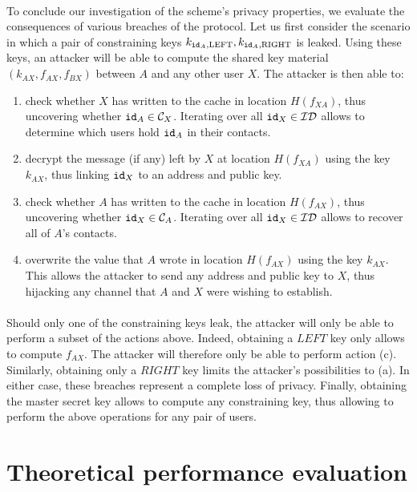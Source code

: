	\paragraph{} To conclude our investigation of the scheme's privacy properties, we evaluate the consequences of various breaches of the protocol. Let us first consider the scenario in which a pair of constraining keys $k_{\mathtt{id}_A,\mathrm{LEFT}}, k_{\mathtt{id}_A,\mathrm{RIGHT}}$ is leaked. Using these keys, an attacker will be able to compute the shared key material $(k_{AX}, f_{AX}, f_{BX})$ between $A$ and any other user $X$. The attacker is then able to:
	\begin{enumerate}[label=(\alph*)]
		\item check whether $X$ has written to the cache in location $H(f_{XA})$, thus uncovering whether $\mathtt{id}_A \in \mathcal{C}_{X}$. Iterating over all $\mathtt{id}_X \in \mathcal{ID}$ allows to determine which users hold $\mathtt{id}_A$ in their contacts. 
		\item decrypt the message (if any) left by $X$ at location $H(f_{XA})$ using the key $k_{AX}$, thus linking $\mathtt{id}_X$ to an address and public key.
		\item check whether $A$ has written to the cache in location $H(f_{AX})$, thus uncovering whether $\mathtt{id}_X \in \mathcal{C}_{A}$. Iterating over all $\mathtt{id}_X \in \mathcal{ID}$ allows to recover all of $A$'s contacts.
		\item overwrite the value that $A$ wrote in location $H(f_{AX})$ using the key $k_{AX}$. This allows the attacker to send any address and public key to $X$, thus hijacking any channel that $A$ and $X$ were wishing to establish.
	\end{enumerate}
	
	\paragraph{} Should only one of the constraining keys leak, the attacker will only be able to perform a subset of the actions above. Indeed, obtaining a $LEFT$ key only allows to compute $f_{AX}$. The attacker will therefore only be able to perform action (c). Similarly, obtaining only a $RIGHT$ key limits the attacker's possibilities to (a). In either case, these breaches represent a complete loss of privacy. Finally, obtaining the master secret key allows to compute any constraining key, thus allowing to perform the above operations for any pair of users.


\section{Theoretical performance evaluation}
\label{sec:performance}



